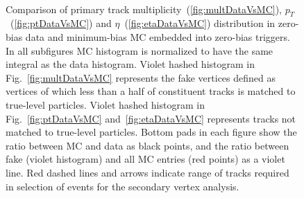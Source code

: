 \begin{figure}[b!]
{}%
\quad\quad%
\parbox{0.4725\textwidth}{
  \centering
  \begin{subfigure}[b]{\linewidth}\addtocounter{subfigure}{-2}
  \end{subfigure}\\
  \begin{minipage}[t][1.042\linewidth][t]{\linewidth}\vspace{10pt}
    \caption[Comparison of primary track multiplicity, $p_{T}$ and $\eta$ distribution in zero-bias data and embedded MC (minimum-bias).]%
    {Comparison of primary track multiplicity~(\ref{fig:multDataVsMC}), $p_{T}$~(\ref{fig:ptDataVsMC}) and $\eta$~(\ref{fig:etaDataVsMC}) distribution in zero-bias data and minimum-bias MC embedded into zero-bias triggers. In all subfigures MC histogram is normalized to have the same integral as the data histogram. Violet hashed histogram in Fig.~\ref{fig:multDataVsMC} represents the fake vertices defined as vertices of which less than a half of constituent tracks is matched to true-level particles. Violet hashed histogram in Fig.~\ref{fig:ptDataVsMC} and~\ref{fig:etaDataVsMC} represents tracks not matched to true-level particles. Bottom pads in each figure show the ratio between MC and data as black points, and the ratio between fake (violet histogram) and all MC entries (red points) as a violet line. Red dashed lines and arrows indicate range of tracks required in selection of events for the secondary vertex analysis.}\label{fig:deadMatDataVsMC}
  \end{minipage}
}\vspace{-20pt}%
\end{figure}


